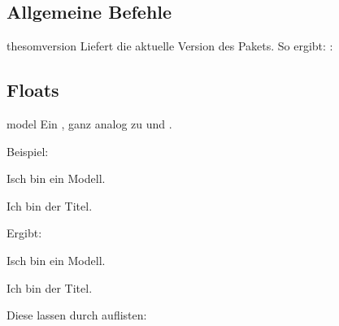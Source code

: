 \documentclass{sopra-base}
\begin{document}
\subsection{Allgemeine Befehle}

\begin{command}{thesomversion}{}
    Liefert die aktuelle Version des Pakets. So ergibt: : \thesomversion\\
\end{command}

\subsection{Floats}

\begin{environment}{model}{}
    Ein , ganz analog zu  und .
\end{environment}

Beispiel:
\begin{plainlatex}[morekeywords={[3]{model}}]
    \begin{model}
        \centering
        Isch bin ein Modell.
        \caption[Und ich eigentlich kürzer.]{Ich bin der Titel.}
    \end{model}
\end{plainlatex}
Ergibt:
\begin{model}
    \centering
    Isch bin ein Modell.
    \caption[Und ich eigentlich kürzer.]{Ich bin der Titel.}
\end{model}

Diese lassen durch  auflisten:

\listofmodel
\end{document}
